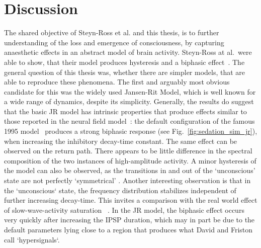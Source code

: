 \chapter{Discussion}
The shared objective of Steyn-Ross et al. and this thesis,
is to further understanding of the loss and emergence of consciousness,
by capturing anaesthetic effects in an abstract model of brain activity.
Steyn-Ross at al.\ were able to show,
that their model produces hysteresis and a biphasic effect~\cite{hutt_progress_2011}.
The general question of this thesis was,
whether there are simpler models,
that are able to reproduce these phenomena.
The first and arguably most obvious candidate for this was the widely used Jansen-Rit Model,
which is well known for a wide range of dynamics, despite its simplicity.
Generally, the results do suggest that the basic JR model has intrinsic properties that produce
effects similar to those reported in the neural field model~\cite{hutt_progress_2011}:
the default configuration of the famous 1995 model~\cite{jansen_electroencephalogram_1995}
produces a strong biphasic response (see Fig.~\ref{fig:sedation_sim_jr}),
when increasing the inhibitory decay-time constant.
The same effect can be observed on the return path.
There appears to be little difference in the spectral composition of the two instances of high-amplitude activity.
A minor hysteresis of the model can also be observed, as the transitions in and out of the `unconscious' state are not
perfectly `symmetrical' .
Another interesting observation is that in the `unconscious` state, the frequency distribution stabilizes independent
of further increasing decay-time.
This invites a comparison with the real world effect of  slow-wave-activity
saturation ~\cite{ni_mhuircheartaigh_slow_wave_2013}.
In the JR model, the biphasic effect occurs very quickly after increasing the IPSP duration, which may in part be due
to the default parameters lying close to a region that produces what David and Friston call
`hypersignals`\cite{david_neural_2003}.

